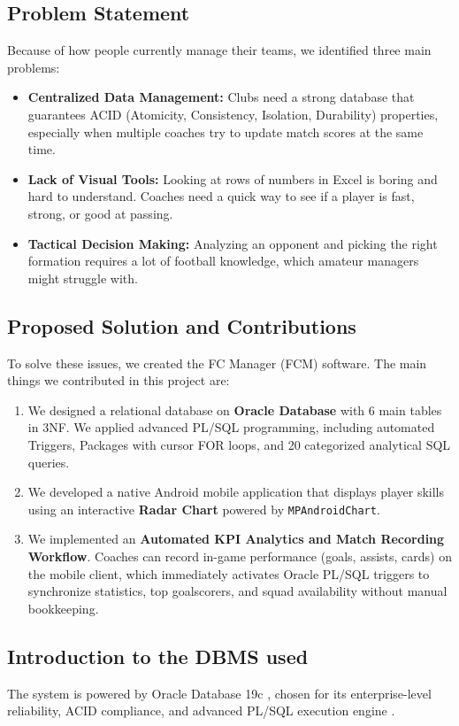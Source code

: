 \documentclass[fonts]{icst}
\begin{document}
\subsection{Problem Statement}
Because of how people currently manage their teams, we identified three main problems:
\begin{itemize}
    \item \textbf{Centralized Data Management:} Clubs need a strong database that guarantees ACID (Atomicity, Consistency, Isolation, Durability) properties, especially when multiple coaches try to update match scores at the same time.
    \item \textbf{Lack of Visual Tools:} Looking at rows of numbers in Excel is boring and hard to understand. Coaches need a quick way to see if a player is fast, strong, or good at passing.
    \item \textbf{Tactical Decision Making:} Analyzing an opponent and picking the right formation requires a lot of football knowledge, which amateur managers might struggle with.
\end{itemize}

\subsection{Proposed Solution and Contributions}
To solve these issues, we created the FC Manager (FCM) software. The main things we contributed in this project are:
\begin{enumerate}
    \item We designed a relational database on \textbf{Oracle Database} with 6 main tables in 3NF. We applied advanced PL/SQL programming, including automated Triggers, Packages with cursor FOR loops, and 20 categorized analytical SQL queries.
    \item We developed a native Android mobile application that displays player skills using an interactive \textbf{Radar Chart} powered by \texttt{MPAndroidChart}.
    \item We implemented an \textbf{Automated KPI Analytics and Match Recording Workflow}. Coaches can record in-game performance (goals, assists, cards) on the mobile client, which immediately activates Oracle PL/SQL triggers to synchronize statistics, top goalscorers, and squad availability without manual bookkeeping.
\end{enumerate}

\subsection{Introduction to the DBMS used}
The system is powered by Oracle Database 19c \cite{oracle_sql_ref}, chosen for its enterprise-level reliability, ACID compliance, and advanced PL/SQL execution engine \cite{oracle_plsql_guide}.
\end{document}
